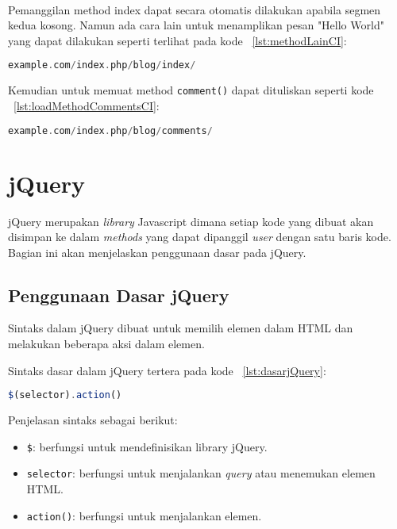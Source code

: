 \\ \noindent 
Pemanggilan method index dapat secara otomatis dilakukan apabila segmen kedua kosong. Namun ada cara lain untuk menamplikan pesan "Hello World" yang dapat dilakukan seperti terlihat pada kode ~\ref{lst:methodLainCI}:

\begin{lstlisting}[style=customphp, language=PHP, basicstyle=\ttfamily, frame=single, columns=fullflexible, keepspaces=true, breaklines=true, showstringspaces=false, label={lst:methodLainCI}, caption=Cara lain pemanggilan method pada codeIgniter.] 
example.com/index.php/blog/index/
\end{lstlisting}

\noindent Kemudian untuk memuat method \texttt{comment()} dapat dituliskan seperti kode ~\ref{lst:loadMethodCommentsCI}:
\begin{lstlisting}[style=customphp, language=PHP, basicstyle=\ttfamily, frame=single, columns=fullflexible, keepspaces=true, breaklines=true, showstringspaces=false, label={lst:loadMethodCommentsCI}, caption=Load metode comments() pada codeIgniter.] 
example.com/index.php/blog/comments/
\end{lstlisting}

\section{jQuery}

jQuery merupakan \textit{library} Javascript dimana setiap kode yang dibuat akan disimpan ke dalam \textit{methods} yang dapat dipanggil \textit{user} dengan satu baris kode. Bagian ini akan menjelaskan penggunaan dasar pada jQuery. \cite{jquery}

\subsection{Penggunaan Dasar jQuery}
\noindent Sintaks dalam jQuery dibuat untuk memilih elemen dalam HTML dan melakukan beberapa aksi dalam elemen. 

Sintaks dasar dalam jQuery tertera pada kode ~\ref{lst:dasarjQuery}:
\begin{lstlisting}[style=JavaScript, language=JavaScript, basicstyle=\ttfamily, frame=single, columns=fullflexible, keepspaces=true, breaklines=true, showstringspaces=false, label={lst:dasarjQuery}, caption=Pemanggilan jQuery.]
$(selector).action()
\end{lstlisting}
Penjelasan sintaks sebagai berikut:
\begin{itemize}
	\item \texttt{\$}: berfungsi untuk mendefinisikan library jQuery.
	\item \texttt{selector}: berfungsi untuk menjalankan \textit{query} atau menemukan elemen HTML.
	\item \texttt{action()}: berfungsi untuk menjalankan elemen.
\end{itemize}



